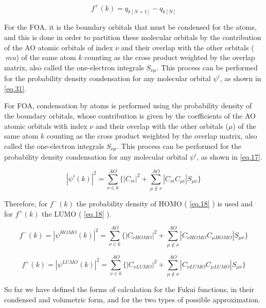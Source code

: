 \documentclass[a4paper,11pt]{refart}
\begin{document}
	\begin{equation}
	f^{+}(k) = q_{k [N+1]} - q_{k [N]}
	\label{eq.16}
	\end{equation}

	For the FOA, it is the boundary orbitals that must be condensed for the atoms, and this is done in order to partition these molecular orbitals by the contribution of the AO atomic orbitals of index $\nu$ and their overlap with the other orbitals ($\ mu$) of the same atom $k$ counting as the cross product weighted by the overlap matrix, also called the one-electron integrals $S_{\nu\mu}$. This process can be performed for the probability density condensation for any molecular orbital $\psi^i$, as shown in \autoref{eq.31}.

	For FOA, condensation by atoms is performed using the probability density of the boundary orbitals, whose contribution is given by the coefficients of the AO atomic orbitals with index $\nu$ and their overlap with the other orbitals ($\mu$) of the same atom $k$ counting as the cross product weighted by the overlap matrix, also called the one-electron integrals $S_{\nu\mu}$. This process can be performed for the probability density condensation for any molecular orbital $\psi^i$, as shown in \autoref{eq.17}.

	\begin{equation}
	|\psi^i(k)|^2  =\sum_{\nu \in k}^{AO} \Bigg \{ |C_{\nu i}|^{2} + \sum_{\mu \notin \nu }^{AO} |C_{\nu i} C_{\mu i}|S_{\mu \nu} \Bigg \}
	\label{eq.17}
	\end{equation}

	Therefore, for $f^-(k)$ the probability density of HOMO ( \autoref{eq.18} ) is used and for $f^+(k)$ the LUMO ( \autoref{eq.18} ).

	\begin{equation}
	f^-(k) =|\psi^{HOMO}(k)|^2 =  \sum_{\nu \in k}^{AO} \Bigg \{ |C_{\nu HOMO}|^{2} + \sum_{\mu \notin \nu }^{AO} |C_{\nu HOMO} C_{\mu HOMO}|S_{\mu \nu} \Bigg \}
	\label{eq.18}
	\end{equation}

	\begin{equation}
	f^+(k) = |\psi^{LUMO}(k)|^2 = \sum_{\nu \in k}^{AO} \Bigg \{ |C_{\nu LUMO}|^{2} + \sum_{\mu \notin \nu }^{AO} |C_{\nu LUMO} C_{\mu LUMO}|S_{\mu \nu} \Bigg \}
	\label{eq.19}
	\end{equation}

	So far we have defined the forms of calculation for the Fukui functions, in their condensed and volumetric form, and for the two types of possible approximation.
\end{document}
